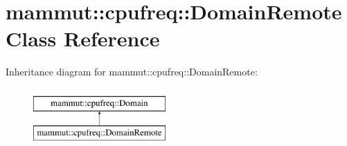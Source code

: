 \hypertarget{classmammut_1_1cpufreq_1_1DomainRemote}{\section{mammut\-:\-:cpufreq\-:\-:Domain\-Remote Class Reference}
\label{classmammut_1_1cpufreq_1_1DomainRemote}
}
Inheritance diagram for mammut\-:\-:cpufreq\-:\-:Domain\-Remote\-:\begin{figure}[H]
\begin{center}
\leavevmode
\includegraphics[height=2.000000cm]{classmammut_1_1cpufreq_1_1DomainRemote}
\end{center}
\end{figure}
